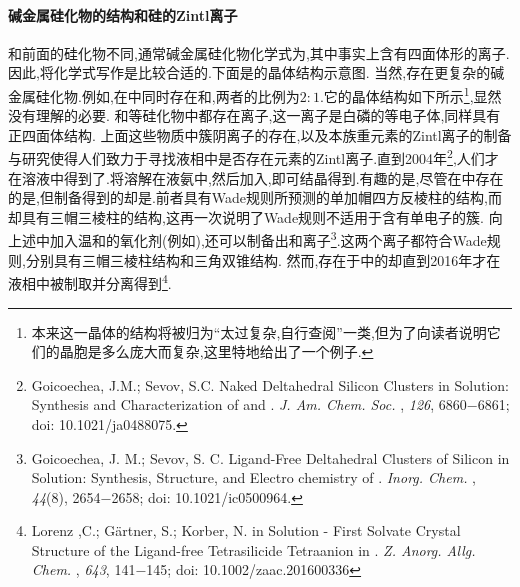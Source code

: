 \documentclass{ctexart}
\begin{document}
\paragraph{碱金属硅化物的结构和硅的Zintl离子}
和前面的硅化物不同,通常碱金属硅化物化学式为,其中事实上含有四面体形的离子.因此,将化学式写作是比较合适的.下面是的晶体结构示意图.
当然,存在更复杂的碱金属硅化物.例如,在中同时存在和,两者的比例为$2:1$.它的晶体结构如下所示\footnote{本来这一晶体的结构将被归为“太过复杂,自行查阅”一类,但为了向读者说明它们的晶胞是多么庞大而复杂,这里特地给出了一个例子.},显然没有理解的必要.
\indent {}和等硅化物中都存在离子,这一离子是白磷的等电子体,同样具有正四面体结构.
\indent 上面这些物质中簇阴离子的存在,以及本族重元素的Zintl离子的制备与研究使得人们致力于寻找液相中是否存在元素的Zintl离子.直到2004年\footnote{Goicoechea, J.M.; Sevov, S.C. Naked Deltahedral Silicon Clusters in Solution: Synthesis and Characterization of  and
. \textit{J. Am. Chem. Soc.} , \textit{126}, 6860$-$6861; doi: 10.1021/ja0488075.},人们才在溶液中得到了.将溶解在液氨中,然后加入,即可结晶得到.有趣的是,尽管在中存在的是,但制备得到的却是.前者具有Wade规则所预测的单加帽四方反棱柱的结构,而却具有三帽三棱柱的结构,这再一次说明了Wade规则不适用于含有单电子的簇.
向上述中加入温和的氧化剂(例如),还可以制备出和离子\footnote{Goicoechea, J. M.; Sevov, S. C. Ligand-Free Deltahedral Clusters of Silicon in Solution: Synthesis, Structure, and Electro
chemistry of . \textit{Inorg. Chem.} , \textit{44}(8), 2654$-$2658; doi: 10.1021/ic0500964.}.这两个离子都符合Wade规则,分别具有三帽三棱柱结构和三角双锥结构.
然而,存在于中的却直到2016年才在液相中被制取并分离得到\footnote{Lorenz ,C.; Gärtner, S.; Korber, N.  in Solution - First Solvate Crystal Structure of the Ligand-free Tetrasilicide Tetraanion in . \textit{Z. Anorg. Allg. Chem.} , \textit{643}, 141$-$145; doi: 10.1002/zaac.201600336}.
\end{document}
